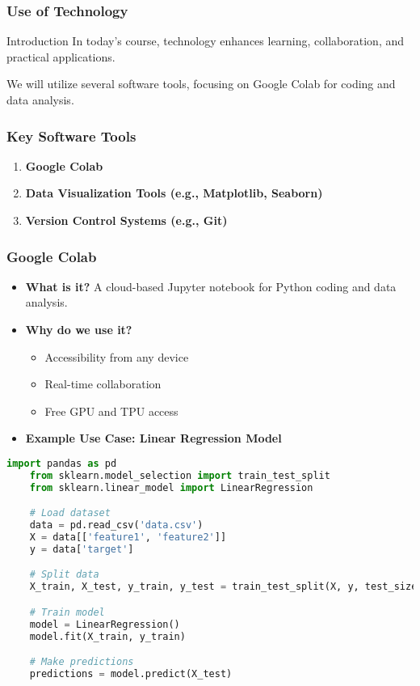 \documentclass[aspectratio=169]{beamer}
\begin{document}
\begin{frame}
    \frametitle{Use of Technology}
    \begin{block}{Introduction}
        In today's course, technology enhances learning, collaboration, and practical applications.
    \end{block}
    We will utilize several software tools, focusing on Google Colab for coding and data analysis.
\end{frame}

\begin{frame}
    \frametitle{Key Software Tools}
    \begin{enumerate}
        \item \textbf{Google Colab}
        \item \textbf{Data Visualization Tools (e.g., Matplotlib, Seaborn)}
        \item \textbf{Version Control Systems (e.g., Git)}
    \end{enumerate}
\end{frame}

\begin{frame}[fragile]
    \frametitle{Google Colab}
    \begin{itemize}
        \item \textbf{What is it?} A cloud-based Jupyter notebook for Python coding and data analysis.
        \item \textbf{Why do we use it?}
            \begin{itemize}
                \item Accessibility from any device
                \item Real-time collaboration
                \item Free GPU and TPU access
            \end{itemize}
        \item \textbf{Example Use Case: Linear Regression Model}
    \end{itemize}
    
    \begin{lstlisting}[language=Python]
    import pandas as pd
    from sklearn.model_selection import train_test_split
    from sklearn.linear_model import LinearRegression

    # Load dataset
    data = pd.read_csv('data.csv')
    X = data[['feature1', 'feature2']]
    y = data['target']

    # Split data
    X_train, X_test, y_train, y_test = train_test_split(X, y, test_size=0.2)

    # Train model
    model = LinearRegression()
    model.fit(X_train, y_train)

    # Make predictions
    predictions = model.predict(X_test)
    \end{lstlisting}
\end{frame}
\end{document}
